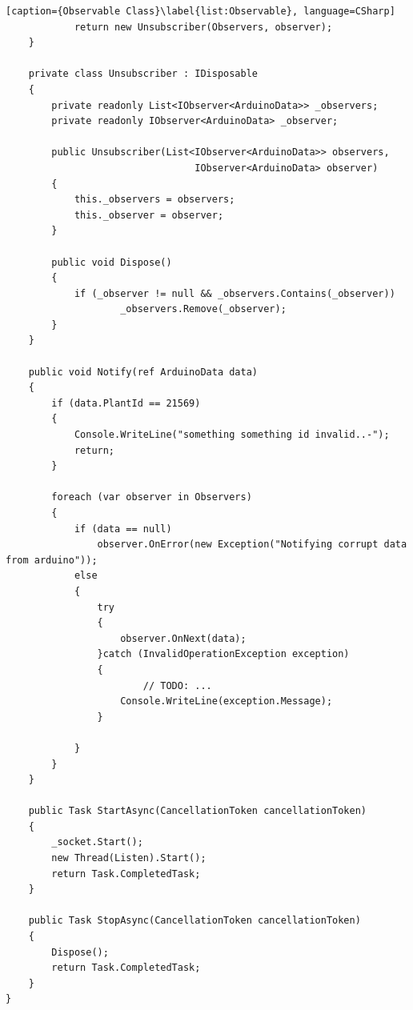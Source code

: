 \documentclass[a4paper,12pt,twoside,openright,titlepage]{book}
\begin{document}
\begin{lstlisting}[caption={Observable Class}\label{list:Observable}, language=CSharp]
            return new Unsubscriber(Observers, observer);
    }

	private class Unsubscriber : IDisposable
	{
		private readonly List<IObserver<ArduinoData>> _observers;
	    private readonly IObserver<ArduinoData> _observer;

        public Unsubscriber(List<IObserver<ArduinoData>> observers,
        						 IObserver<ArduinoData> observer)
		{
			this._observers = observers;
			this._observer = observer;
		}
		
		public void Dispose()
		{
			if (_observer != null && _observers.Contains(_observer))
					_observers.Remove(_observer);
        }
	}

	public void Notify(ref ArduinoData data)
	{
		if (data.PlantId == 21569)
		{
			Console.WriteLine("something something id invalid..-");
            return;
		}
            
		foreach (var observer in Observers)
		{
			if (data == null)
				observer.OnError(new Exception("Notifying corrupt data from arduino"));
			else
			{
				try
				{
					observer.OnNext(data);
				}catch (InvalidOperationException exception)
				{
                        // TODO: ...
					Console.WriteLine(exception.Message);
				}

			}
		}
	}

	public Task StartAsync(CancellationToken cancellationToken)
	{
		_socket.Start();
	    new Thread(Listen).Start();
        return Task.CompletedTask;
	}

	public Task StopAsync(CancellationToken cancellationToken)
	{
		Dispose();
	    return Task.CompletedTask;
    }
}
\end{lstlisting}
\end{document}
